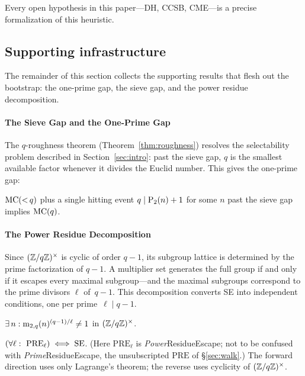 Every open hypothesis in this paper---DH, CCSB, CME---is a precise
formalization of this heuristic.

\subsection{Supporting infrastructure}

The remainder of this section collects the supporting results that
flesh out the bootstrap: the one-prime gap, the sieve gap, and the power residue decomposition.

\paragraph{The Sieve Gap and the One-Prime Gap}

The $q$-roughness theorem (Theorem~\ref{thm:roughness}) resolves the
selectability problem described in Section~\ref{sec:intro}: past the
sieve gap, $q$ is the smallest available factor whenever it divides
the Euclid number.  This gives the one-prime gap:

\begin{theorem}
\label{thm:one-prime-gap}
$\mathrm{MC}({<}\,q)$ plus a single hitting event
$q \mid \mathrm{P}_{2}(n)+1$ for some $n$ past the sieve gap
implies $\mathrm{MC}(q)$.
\end{theorem}

\paragraph{The Power Residue Decomposition}

Since $(\mathbb{Z}/q\mathbb{Z})^\times$ is cyclic of order $q\!-\!1$, its subgroup
lattice is determined by the prime factorization of $q\!-\!1$.  A
multiplier set generates the full group if and only if it escapes every
maximal subgroup---and the maximal subgroups correspond to the prime
divisors $\ell$ of~$q\!-\!1$.  This decomposition converts SE into
independent conditions, one per prime~$\ell \mid q\!-\!1$.

\begin{property}
$\exists\, n : \mathrm{m}_{2,q}(n)^{(q-1)/\ell} \neq 1$ in $(\mathbb{Z}/q\mathbb{Z})^\times$.
\end{property}

\begin{theorem}
$(\forall \ell:\ \mathrm{PRE}_\ell) \;\Longleftrightarrow\; \mathrm{SE}$.
(Here $\mathrm{PRE}_\ell$ is \emph{Power}ResidueEscape; not to be
confused with \emph{Prime}ResidueEscape, the unsubscripted
$\mathrm{PRE}$ of \S\ref{sec:walk}.)
The forward direction uses only Lagrange's theorem; the reverse uses
cyclicity of $(\mathbb{Z}/q\mathbb{Z})^\times$.
\end{theorem}

